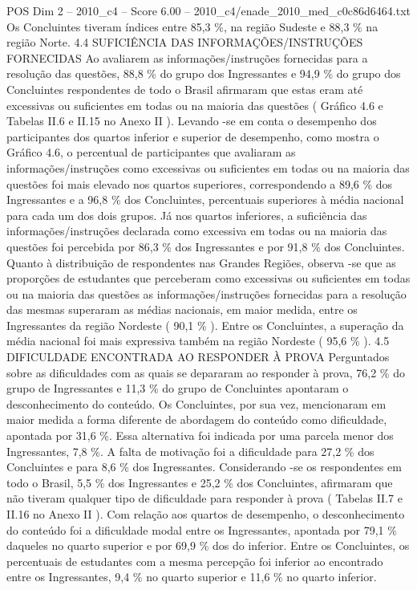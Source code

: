 \begin{textsample}{POS Dim 2 – 2010\_c4 – Score 6.00 – 2010\_c4/enade\_2010\_med\_c0c86d6464.txt}
Os Concluintes tiveram índices entre 85,3 \%, na região Sudeste e 88,3 \% na região Norte. 4.4 SUFICIÊNCIA DAS INFORMAÇÕES/INSTRUÇÕES FORNECIDAS Ao avaliarem as informações/instruções fornecidas para a resolução das questões, 88,8 \% do grupo dos Ingressantes e 94,9 \% do grupo dos Concluintes respondentes de todo o Brasil afirmaram que estas eram até excessivas ou suficientes em todas ou na maioria das questões ( Gráfico 4.6 e Tabelas II.6 e II.15 no Anexo II ).
Levando -se em conta o desempenho dos participantes dos quartos inferior e superior de desempenho, como mostra o Gráfico 4.6, o percentual de participantes que avaliaram as informações/instruções como excessivas ou suficientes em todas ou na maioria das questões foi mais elevado nos quartos superiores, correspondendo a 89,6 \% dos Ingressantes e a 96,8 \% dos Concluintes, percentuais superiores à média nacional para cada um dos dois grupos.
Já nos quartos inferiores, a suficiência das informações/instruções declarada como excessiva em todas ou na maioria das questões foi percebida por 86,3 \% dos Ingressantes e por 91,8 \% dos Concluintes.
Quanto à distribuição de respondentes nas Grandes Regiões, observa -se que as proporções de estudantes que perceberam como excessivas ou suficientes em todas ou na maioria das questões as informações/instruções fornecidas para a resolução das mesmas superaram as médias nacionais, em maior medida, entre os Ingressantes da região Nordeste ( 90,1 \% ).
Entre os Concluintes, a superação da média nacional foi mais expressiva também na região Nordeste ( 95,6 \% ). 4.5 DIFICULDADE ENCONTRADA AO RESPONDER À PROVA Perguntados sobre as dificuldades com as quais se depararam ao responder à prova, 76,2 \% do grupo de Ingressantes e 11,3 \% do grupo de Concluintes apontaram o desconhecimento do conteúdo.
Os Concluintes, por sua vez, mencionaram em maior medida a forma diferente de abordagem do conteúdo como dificuldade, apontada por 31,6 \%.
Essa alternativa foi indicada por uma parcela menor dos Ingressantes, 7,8 \%.
A falta de motivação foi a dificuldade para 27,2 \% dos Concluintes e para 8,6 \% dos Ingressantes.
Considerando -se os respondentes em todo o Brasil, 5,5 \% dos Ingressantes e 25,2 \% dos Concluintes, afirmaram que não tiveram qualquer tipo de dificuldade para responder à prova ( Tabelas II.7 e II.16 no Anexo II ).
Com relação aos quartos de desempenho, o desconhecimento do conteúdo foi a dificuldade modal entre os Ingressantes, apontada por 79,1 \% daqueles no quarto superior e por 69,9 \% dos do inferior.
Entre os Concluintes, os percentuais de estudantes com a mesma percepção foi inferior ao encontrado entre os Ingressantes, 9,4 \% no quarto superior e 11,6 \% no quarto inferior.

\end{textsample}
